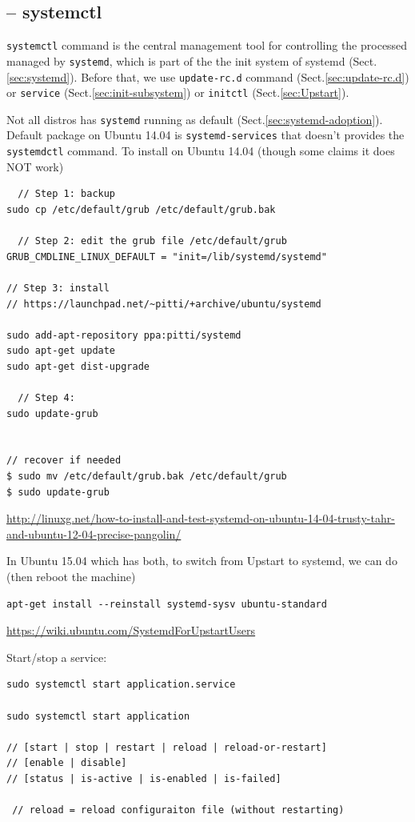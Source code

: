 \subsection{-- systemctl}
\label{sec:systemctl}

\verb!systemctl! command is the central management tool for controlling
the processed managed by \verb!systemd!, which is part of the the init system of
systemd (Sect.\ref{sec:systemd}). Before that, we use \verb!update-rc.d! command
(Sect.\ref{sec:update-rc.d}) or \verb!service! (Sect.\ref{sec:init-subsystem})
or \verb!initctl! (Sect.\ref{sec:Upstart}).

Not all distros has \verb!systemd! running as default
(Sect.\ref{sec:systemd-adoption}). Default package on Ubuntu 14.04 is
\verb!systemd-services! that doesn't provides the \verb!systemdctl! command. To
install on Ubuntu 14.04 (though some claims it does NOT work)
\begin{verbatim}
  // Step 1: backup 
sudo cp /etc/default/grub /etc/default/grub.bak

  // Step 2: edit the grub file /etc/default/grub
GRUB_CMDLINE_LINUX_DEFAULT = "init=/lib/systemd/systemd" 

// Step 3: install  
// https://launchpad.net/~pitti/+archive/ubuntu/systemd

sudo add-apt-repository ppa:pitti/systemd
sudo apt-get update
sudo apt-get dist-upgrade 

  // Step 4: 
sudo update-grub


// recover if needed
$ sudo mv /etc/default/grub.bak /etc/default/grub
$ sudo update-grub
\end{verbatim}
\url{http://linuxg.net/how-to-install-and-test-systemd-on-ubuntu-14-04-trusty-tahr-and-ubuntu-12-04-precise-pangolin/}

In Ubuntu 15.04 which has both, to switch from Upstart to
systemd, we can do (then reboot the machine)
\begin{verbatim}
apt-get install --reinstall systemd-sysv ubuntu-standard
\end{verbatim}
\url{https://wiki.ubuntu.com/SystemdForUpstartUsers}


Start/stop a service:
\begin{verbatim}
sudo systemctl start application.service

sudo systemctl start application

// [start | stop | restart | reload | reload-or-restart]
// [enable | disable]
// [status | is-active | is-enabled | is-failed]

 // reload = reload configuraiton file (without restarting)
\end{verbatim}

